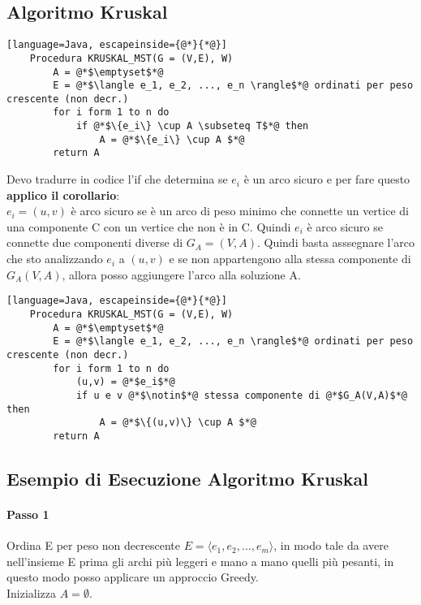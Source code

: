 \subsection{Algoritmo Kruskal}
\begin{lstlisting}[language=Java, escapeinside={@*}{*@}]
    Procedura KRUSKAL_MST(G = (V,E), W)
        A = @*$\emptyset$*@
        E = @*$\langle e_1, e_2, ..., e_n \rangle$*@ ordinati per peso crescente (non decr.)
        for i form 1 to n do
            if @*$\{e_i\} \cup A \subseteq T$*@ then
                A = @*$\{e_i\} \cup A $*@
        return A
\end{lstlisting}
Devo tradurre in codice l'if che determina se $e_i$ è un arco sicuro e per fare questo
\textbf{applico il corollario}:\\
$e_i = (u,v)$ è arco sicuro se è un arco di peso minimo che connette un vertice di una componente C
con un vertice che non è in C. Quindi $e_i$ è arco sicuro se connette due componenti diverse
di $G_A = (V,A)$. Quindi basta asssegnare l'arco che sto analizzando $e_i$ a $(u,v)$ e se
non appartengono alla stessa componente di $G_A(V,A)$, allora posso aggiungere l'arco alla soluzione A.
\begin{lstlisting}[language=Java, escapeinside={@*}{*@}]
    Procedura KRUSKAL_MST(G = (V,E), W)
        A = @*$\emptyset$*@
        E = @*$\langle e_1, e_2, ..., e_n \rangle$*@ ordinati per peso crescente (non decr.)
        for i form 1 to n do
            (u,v) = @*$e_i$*@
            if u e v @*$\notin$*@ stessa componente di @*$G_A(V,A)$*@ then
                A = @*$\{(u,v)\} \cup A $*@
        return A
\end{lstlisting}
\subsection{Esempio di Esecuzione Algoritmo Kruskal}
\paragraph*{Passo 1} Ordina E per peso non decrescente \ra $E=\langle e_1, e_2, ..., e_m\rangle$,
in modo tale da avere nell'insieme E prima gli archi più leggeri e mano a mano quelli più
pesanti, in questo modo posso applicare un approccio Greedy.\\
Inizializza $A = \emptyset$.

